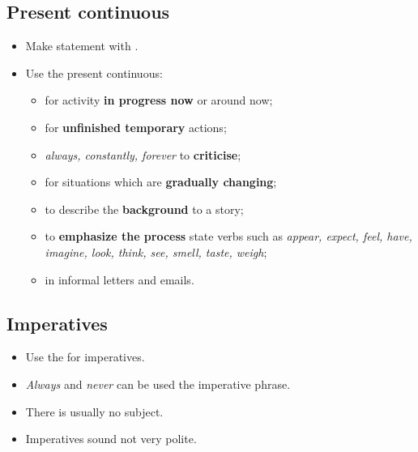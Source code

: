 \subsection{Present continuous}
\begin{itemize}
    \item Make statement with .
    \item Use the present continuous:
    \begin{itemize}
        \item for activity \textbf{in progress now} or around now;
        \item for \textbf{unfinished temporary} actions;
        \item[\daash]  \textit{always, constantly, forever} to \textbf{criticise};
        \item[\daash] for situations which are \textbf{gradually changing};
        \item[\daash] to describe the \textbf{background} to a story;
        \item[\daash] to \textbf{emphasize the process}  state verbs such as
        \textit{appear, expect, feel, have, imagine, look, think, see, smell, taste, weigh};
        \item[\aast] in informal letters and emails.
    \end{itemize}
\end{itemize}

\subsection{Imperatives}
\begin{itemize}
    \item Use the  for imperatives.
    \item \textit{Always} and \textit{never} can be used  the imperative phrase.
    \item There is usually no subject.
    \item Imperatives sound not very polite.
\end{itemize}

